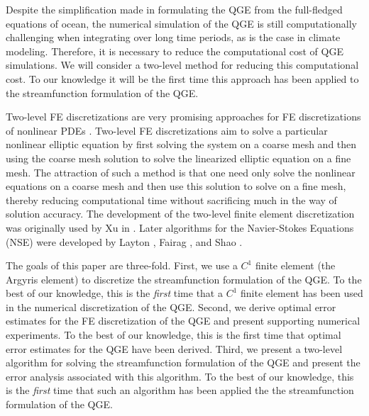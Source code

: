 Despite the simplification made in formulating the QGE from the full-fledged
equations of ocean, the numerical simulation of the QGE is still computationally
challenging when integrating over long time periods, as is the case in climate
modeling. Therefore, it is necessary to reduce the computational cost of QGE
simulations. We will consider a two-level method for reducing this computational
cost. To our knowledge it will be the first time this approach has been applied
to the streamfunction formulation of the QGE.

Two-level FE discretizations are very promising approaches for FE
discretizations of nonlinear PDEs \cite{Fairag98,Layton93}. Two-level FE
discretizations aim to solve a particular nonlinear elliptic equation by
first solving the system on a coarse mesh and then using the coarse mesh
solution to solve the linearized elliptic equation on
a fine mesh. The attraction of such a method is that one need only solve the
nonlinear equations on a coarse mesh and then use this solution to solve on a
fine mesh, thereby reducing computational time without sacrificing much in the
way of solution accuracy. The development of the two-level finite element
discretization was originally used by Xu in \cite{Xu94}. Later algorithms for
the Navier-Stokes Equations (NSE) were developed by Layton \cite{Layton93},
Fairag \cite{Fairag98, Fairag03}, and Shao \cite{Shao11}.

The goals of this paper are three-fold. First, we use a $C^1$ finite element (the
Argyris element) to discretize the streamfunction formulation of the QGE. To the
best of our knowledge, this is the \emph{first} time that a $C^1$ finite element
has been used in the numerical discretization of the QGE. Second, we derive
optimal error estimates for the FE discretization of the QGE and present
supporting numerical experiments. To the best of our knowledge, this is the
first time that optimal error estimates for the QGE have been derived.  Third,
we present a two-level algorithm for solving the streamfunction formulation of
the QGE and present the error analysis associated with this algorithm. To the
best of our knowledge, this is the \emph{first} time that such an algorithm has
been applied the the streamfunction formulation of the QGE.
